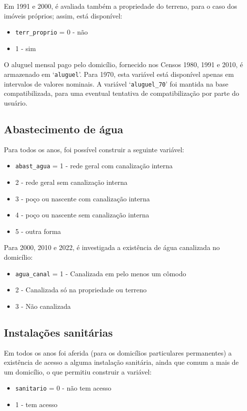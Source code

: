 \documentclass[12pt,a4paper]{article}
\newcommand{\vr}[1]{\texttt{#1}}
\begin{document}
Em 1991 e 2000, é avaliada também a propriedade do terreno, para o caso dos imóveis próprios; assim, está disponível:
\begin{itemize}
  \item \vr{terr\_proprio} = 0 - não
  \item 1 - sim
\end{itemize}

O aluguel mensal pago pelo domicílio, fornecido nos Censos 1980, 1991 e 2010, é armazenado em ‘\vr{aluguel}’. Para 1970, esta variável está disponível apenas em intervalos de valores nominais. A variável ‘\vr{aluguel\_70}’ foi mantida na base compatibilizada, para uma eventual tentativa de compatibilização por parte do usuário.

\subsection{Abastecimento de água}\label{sec:c7}
Para todos os anos, foi possível construir a seguinte variável:
\begin{itemize}
  \item \vr{abast\_agua} = 1 - rede geral com canalização interna
  \item 2 - rede geral sem canalização interna
  \item 3 - poço ou nascente com canalização interna
  \item 4 - poço ou nascente sem canalização interna
  \item 5 - outra forma
\end{itemize}

Para 2000, 2010 e 2022, é investigada a existência de água canalizada no domicílio:
\begin{itemize}
  \item \vr{agua\_canal} = 1 - Canalizada em pelo menos um cômodo
  \item 2 - Canalizada só na propriedade ou terreno
  \item 3 - Não canalizada
\end{itemize}

\subsection{Instalações sanitárias}\label{sec:c8}
Em todos os anos foi aferida (para os domicílios particulares permanentes) a existência de acesso a alguma instalação sanitária, ainda que comum a mais de um domicílio, o que permitiu construir a variável:
\begin{itemize}
  \item \vr{sanitario} = 0 - não tem acesso
  \item 1 - tem acesso
\end{itemize}
\end{document}
